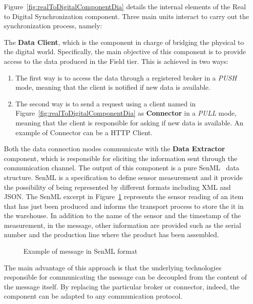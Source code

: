 Figure~\ref{fig:realToDigitalComponentDia} details the internal elements of the Real to Digital Synchronization component. 
Three main units interact to carry out the synchronization process, namely:
\begin{description}
\item The \textbf{Data Client}, which is the component in charge of bridging the physical to the digital world. Specifically, the main objective of this component is to provide access to the data produced in the Field tier. This is achieved in two ways:
\begin{enumerate}
\item The first way is to access the data through a registered broker in a \textit{PUSH} mode, meaning that the client is notified if new data is available.
\item The second way is to send a request using a client named in Figure~\ref{fig:realToDigitalComponentDia} as \textbf{Connector} in a \textit{PULL} mode, meaning that the client is responsible for asking if new data is available. An example of Connector can be a HTTP Client.
\end{enumerate}
Both the data connection modes communicate with the \textbf{Data Extractor} component, which is responsible for eliciting the information sent through the communication channel. 
The output of this component is a pure SenML~\cite{jennings2018sensor} data structure. SenML is a specification to define sensor measurement and it provide the possibility of being represented by different formats including XML and JSON. The SenML excerpt in Figure~\ref{fig:senML} represents the sensor reading of an item that has just been produced and informs the transport process to store the it in the warehouse. In addition to the name of the sensor and the timestamp of the measurement, in the message, other information are provided such as the serial number and the production line where the product has been assembled.

\begin{figure}[h]
  \caption{Example of message in SenML format}
  \label{fig:senML}
\end{figure}

The main advantage of this approach is that the underlying technologies responsible for communicating the message can be decoupled from the content of the message itself. 
By replacing the particular broker or connector, indeed, the component can be adapted to any communication protocol. 


\end{description}
